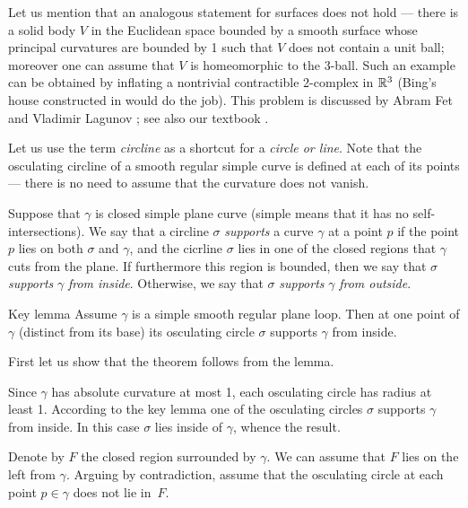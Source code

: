 \documentclass{article}
\begin{document}
Let us mention that an analogous statement for surfaces does not hold --- there is a solid body $V$ in the Euclidean space bounded by a smooth surface whose principal curvatures are bounded by 1 such that $V$ does not contain a unit ball; moreover one can assume that $V$ is homeomorphic to the 3-ball.
Such an example can be obtained by inflating a nontrivial contractible 2-complex in $\mathbb{R}^3$ 
(Bing's house constructed in \cite{bing} would do the job).
This problem is discussed by Abram Fet and Vladimir Lagunov \cite{lagunov-2,lagunov-fet}; see also our textbook \cite{petrunin-zamora}.

\medskip

Let us use the term \emph{circline} as a shortcut for a \emph{circle or line}.
Note that the osculating circline of a smooth regular simple curve is defined at each of its points --- there is no need to assume that the curvature does not vanish.

Suppose that $\gamma$ is closed simple plane curve (simple means that it has no self-intersections).
We say that a circline $\sigma$ \emph{supports} a curve $\gamma$ at a point $p$ if the point $p$ lies on both $\sigma$ and $\gamma$, and the cicrline $\sigma$ lies in one of the closed regions that $\gamma$ cuts from the plane.
If furthermore this region is bounded, then  we say that $\sigma$ \emph{supports} $\gamma$ \emph{from inside}.
Otherwise, we say that $\sigma$ \emph{supports} $\gamma$ \emph{from outside}.



\begin{thm}{Key lemma}\label{thm:moon}
Assume $\gamma$ is a simple smooth regular plane loop.
Then at one point of $\gamma$ (distinct from its base) its osculating circle $\sigma$ %
 supports $\gamma$ from inside.
\end{thm}

First let us show that the theorem follows from the lemma.

Since $\gamma$ has absolute curvature at most 1, each osculating circle has radius at least 1.
According to the key lemma one of the osculating circles $\sigma$ supports $\gamma$ from inside.
In this case $\sigma$ lies inside of $\gamma$, whence the result.
\qeds

Denote by $F$ the closed region surrounded by $\gamma$.
We can assume that $F$ lies on the left from $\gamma$.
Arguing by contradiction,
assume that the osculating circle at each point $p\in \gamma$ does not lie in~$F$.
\end{document}
